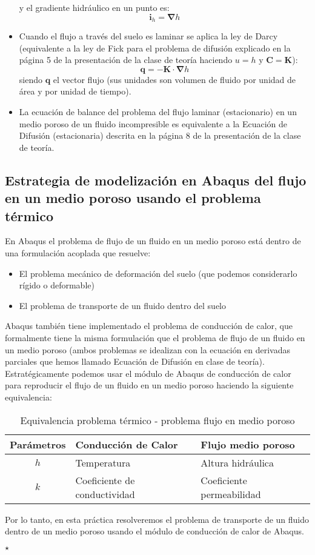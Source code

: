 \begin{itemize}
  y el gradiente hidráulico en un punto es:
  \begin{equation}
    \label{eq:0103}
    \textbf{i}_h=\bm{\nabla}h
  \end{equation}
\item Cuando el flujo a través del suelo es laminar se aplica la ley
  de Darcy (equivalente a la ley de Fick para el problema de difusión
  explicado en la página 5 de la presentación de la clase de teoría
  haciendo $u=h$ y $\bm{C}=\bm{K}$):
  \begin{equation}
    \label{eq:0104}
    \bm{q}=-\bm{K}\cdot \bm{\nabla}h
    \end{equation}
    siendo $\bm{q}$ el vector flujo (sus unidades son volumen de
    fluido por unidad de área y por unidad de tiempo).
  \item La ecuación de balance del problema del flujo laminar
    (estacionario) en un medio poroso de un fluido incompresible es
    equivalente a la Ecuación de Difusión (estacionaria) descrita en
    la página 8 de la presentación de la clase de teoría.
  \end{itemize}

\subsection{Estrategia de modelización en Abaqus del flujo en un medio
  poroso usando el problema térmico}

En Abaqus el problema de flujo de un fluido en un medio poroso está
dentro de una formulación acoplada que resuelve:
\begin{itemize}
\item El problema mecánico de deformación del suelo (que podemos
  considerarlo rígido o deformable)
\item El problema de transporte de un fluido dentro del suelo
\end{itemize}

Abaqus también tiene implementado el problema de conducción de calor,
que formalmente tiene la misma formulación que el problema de flujo de
un fluido en un medio poroso (ambos problemas se idealizan con la
ecuación en derivadas parciales que hemos llamado Ecuación de Difusión
en clase de teoría). Estratégicamente podemos usar el módulo de Abaqus
de conducción de calor para reproducir el flujo de un fluido en un
medio poroso haciendo la siguiente equivalencia:

\begin{table}[!h]
  \centering
  \begin{tabular}{cll}
    \hline
    Parámetros&Conducción de Calor & Flujo medio poroso\\
    \hline
    $h$&Temperatura  &Altura hidráulica    \\
    $k$&Coeficiente de conductividad & Coeficiente permeabilidad  \\
    \hline
  \end{tabular}
  \caption{Equivalencia problema térmico - problema flujo en medio poroso}
  \label{tab:101}
\end{table}

Por lo tanto, en esta práctica resolveremos el problema de transporte
de un fluido dentro de un medio poroso usando el módulo de conducción
de calor de Abaqus.




\hspace{20mm}\hrulefill$\star$\hrulefill\hspace{20mm}
